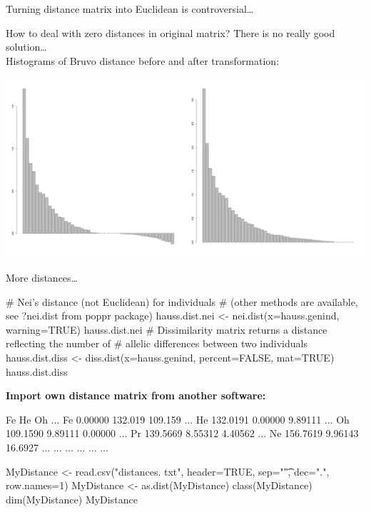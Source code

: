 \documentclass[compress, ucs, xelatex, 11pt, xcolor=svgnames,
  hyperref={
    bookmarks=true,
    unicode=true,
    colorlinks=true,
    pdftitle={Molecular data in R},
    plainpages=false,
    pdfauthor={Vojtech Zeisek},
    pdfsubject={Course about phylogeny and evolution in R},
    pdfcreator={XeLaTeX},
    pdfkeywords={R, evolution, phylogeny, molecular data},
    linkcolor=Tomato,
    anchorcolor=SaddleBrown,
    citecolor=Goldenrod,
    filecolor=DarkMagenta,
    menucolor=Sienna,
    urlcolor=DarkTurquoise,
    pdftex},
  url={hyphens, lowtilde} %
  ]{beamer}
\begin{document}
\begin{frame}{Turning distance matrix into Euclidean is controversial\ldots}
  \begin{footnotesize}
    How to deal with zero distances in original matrix? There is no really good solution\ldots\\ Histograms of Bruvo distance before and after transformation:
  \end{footnotesize}
  \begin{center}
    \includegraphics[width=\textwidth]{bruvodist.png}
  \end{center}
\end{frame}

\begin{frame}[fragile]{More distances\ldots}
  \begin{spluscode}
    # Nei's distance (not Euclidean) for individuals
    # (other methods are available, see ?nei.dist from poppr package)
    hauss.dist.nei <- nei.dist(x=hauss.genind, warning=TRUE)
    hauss.dist.nei
    # Dissimilarity matrix returns a distance reflecting the number of
    # allelic differences between two individuals
    hauss.dist.diss <- diss.dist(x=hauss.genind, percent=FALSE, mat=TRUE)
    hauss.dist.diss
  \end{spluscode}
\vfill
\textbf{Import own distance matrix from another software:}
\begin{multicols}{2}
  \begin{spluscode}
       Fe       He      Oh      ...
    Fe 0.00000  132.019 109.159 ...
    He 132.0191 0.00000 9.89111 ...
    Oh 109.1590 9.89111 0.00000 ...
    Pr 139.5669 8.55312 4.40562 ...
    Ne 156.7619 9.96143 16.6927 ...
    ... ...     ...     ...     ...
  \end{spluscode}
  \columnbreak
  \begin{spluscode}
    MyDistance <- read.csv("distances.
      txt", header=TRUE, sep="\t",
      dec=".", row.names=1)
    MyDistance <- as.dist(MyDistance)
    class(MyDistance)
    dim(MyDistance)
    MyDistance
  \end{spluscode}
\end{multicols}
\end{frame}
\end{document}
